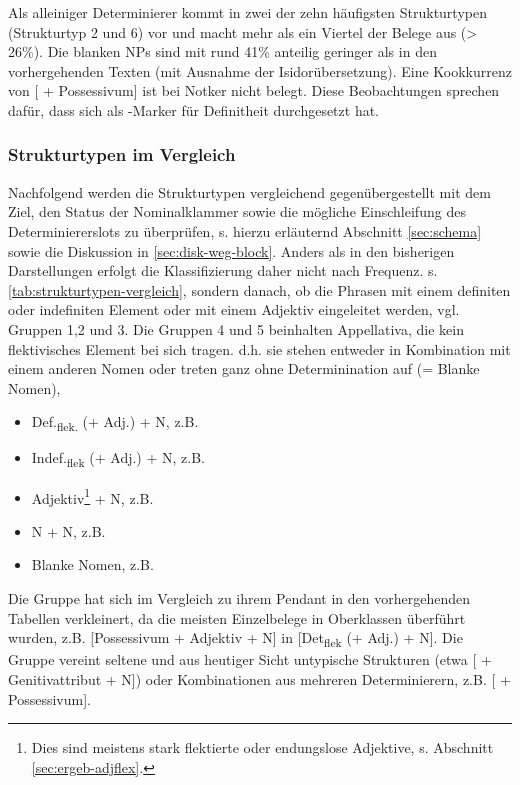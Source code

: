 Als alleiniger Determinierer kommt  in zwei der zehn häufigsten Strukturtypen (Strukturtyp 2 und 6) vor und macht mehr als ein Viertel der Belege aus (> 26\%). Die blanken NPs sind mit rund 41\% anteilig geringer als in den vorhergehenden Texten (mit Ausnahme der Isidorübersetzung). Eine Kookkurrenz von [ + Possessivum] ist bei Notker nicht belegt. Diese Beobachtungen sprechen dafür, dass  sich als -Marker für  Definitheit durchgesetzt hat. 

\subsubsection{Strukturtypen im Vergleich} \label{sec:strukturtypen-vergleich}

Nachfolgend werden die Strukturtypen vergleichend gegenübergestellt mit dem Ziel, den Status der Nominalklammer sowie die mögliche Einschleifung des Determiniererslots zu überprüfen, s. hierzu erläuternd Abschnitt \ref{sec:schema} sowie die Diskussion in \ref{sec:disk-weg-block}. Anders als in den bisherigen Darstellungen erfolgt die Klassifizierung  daher nicht nach Frequenz. s. \ref{tab:strukturtypen-vergleich}, sondern danach, ob die Phrasen mit einem definiten oder indefiniten Element oder mit einem Adjektiv eingeleitet werden, vgl. Gruppen 1,2 und 3. Die Gruppen 4 und 5 beinhalten  Appellativa, die kein flektivisches Element bei sich tragen. d.h. sie stehen entweder in Kombination mit einem anderen Nomen oder treten ganz ohne Determinination auf (= Blanke Nomen), 

\begin{itemize}
\item[1] Def.\textsubscript{flek.} (+ Adj.) + N, z.B.  
\item[2] Indef.\textsubscript{flek} (+ Adj.) + N, z.B. 
\item[3] Adjektiv\footnote{Dies sind meistens stark flektierte oder endungslose Adjektive, s. Abschnitt \ref{sec:ergeb-adjflex}.} + N, z.B.  
\item[4] N + N, z.B. 
\item[5] Blanke Nomen, z.B. 
\end{itemize}

Die Gruppe  hat sich im Vergleich zu ihrem Pendant in den vorhergehenden Tabellen verkleinert, da die meisten Einzelbelege in Oberklassen überführt wurden,  z.B. [Possessivum + Adjektiv + N] in [Det\textsubscript{flek} (+ Adj.) + N]. Die Gruppe vereint seltene und aus heutiger Sicht untypische Strukturen (etwa [ + Genitivattribut + N]) oder Kombinationen aus mehreren Determinierern, z.B. [ + Possessivum]. 

